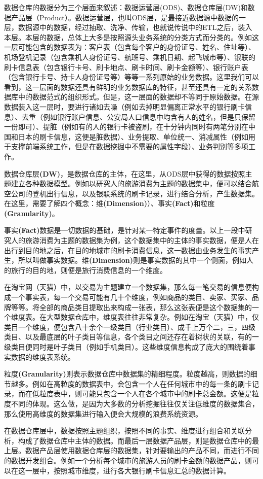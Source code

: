 \par 数据仓库的数据分为三个层面来叙述：数据运营层(ODS)、数据仓库层(DW)和数据产品层（Product）。数据运营层，也叫ODS层，是最接近数据源中数据的一层，数据源中的数据，经过抽取、洗净、传输，也就说传说中的ETL之后，装入本层。本层的数据，总体上大多是按照源头业务系统的分类方式而分类的。例如这一层可能包含的数据表为：客户表（包含每个客户的身份证号、姓名、住址等）、机场登机记录（包含乘机人身份证号、航班号、乘机日期、起飞城市等）、银联的刷卡信息表（包含银行卡号、刷卡地点、刷卡时间、刷卡金额等）、银行账户表（包含银行卡号、持卡人身份证号等）等等一系列原始的业务数据。这里我们可以看到，这一层面的数据还具有鲜明的业务数据库的特征，甚至还具有一定的关系数据库中的数据范式的组织形式。但是，这一层面的数据却不等同于原始数据。在源数据装入这一层时，要进行诸如去噪（例如去掉明显偏离正常水平的银行刷卡信息）、去重（例如银行账户信息、公安局人口信息中均含有人的姓名，但是只保留一份即可）、提脏（例如有的人的银行卡被盗刷，在十分钟内同时有两笔分别在中国和日本的刷卡信息，这便是脏数据）、业务提取、单位统一、消减属性（例如用于支撑前端系统工作，但是在数据挖掘中不需要的属性字段）、业务判别等多项工作。
\par 数据仓库层\textbf{(DW)}，是数据仓库的主体，在这里，从ODS层中获得的数据按照主题建立各种数据模型。例如以研究人的旅游消费为主题的数据集中，便可以结合航空公司的登机出行信息，以及银联系统的刷卡记录，进行结合分析，产生数据集。在这里，需要了解四个概念：维\textbf{(Dimension)}）、事实\textbf{(Fact)}和粒度\textbf{(Granularity)}。
\par 事实\textbf{(Fact)}数据是一切数据的基础，是针对某一特定事件的度量。以上一段中研究人的旅游消费为主题的数据集为例，这个数据集中的主体的事实数据，便是人在出行到目的地之后，在目的地城市的刷卡消费信息，这一数据由业务发生的事实产生，所以叫做事实数据。维\textbf{(Dimension)}则是事实数据的其中一个侧面，例如人的旅行的目的地，则便是旅行消费信息的一个维度。
\par 在淘宝网（天猫）中，以交易为主题建立一个数据集，那么每一笔交易的信息便构成一个事实表，每一个交易可能有几十个维度，例如商品的类目、卖家、买家、品牌等等。将全部的商品类目提取出来构成一张表，那么这张表便是这个数据集的一个维度表。在大型数据仓库中，维度表往往非常复杂。例如在淘宝（天猫）中，仅类目一个维度，便包含八十余个一级类目（行业类目）、成千上万个二，三，四级类目、以及最底层的叶子类目等信息，各个类目之间还存在着树状的关联，有的一级类目便同时是叶子类目（例如手机类目）。这些维度信息构成了庞大的围绕着事实数据的维度表系统。
\par 粒度\textbf{(Granularity)}则表示数据仓库中数据集的精细程度。粒度越高，则数据的细节越多。例如在高粒度的数据表中，会包含一个人在任何城市中的每一条的刷卡记录，而在低粒度表中，则可能只包含一个人在各个城市中的刷卡总金额。这便是粒度不同的体现。这么做，是因为大多数的分析挖掘往往仅关注低维度的数据集合，那么使用高维度的数据集进行输入便会大规模的浪费系统资源。
\par 在数据仓库层中，数据按照主题组织，按照不同的事实、维度进行组合和关联分析，构成了数据仓库中主体的数据。而最后一层数据产品层，则是数据仓库中的最上层。数据产品层使用数据仓库层的数据集，针对要输出的产品不同，而进行不同的数据开发组合。例如一个分析每个城市的旅游人员的刷卡金额的数据产品，则可以在这一层中，按照城市维度，进行各大银行刷卡信息汇总的数据计算。

